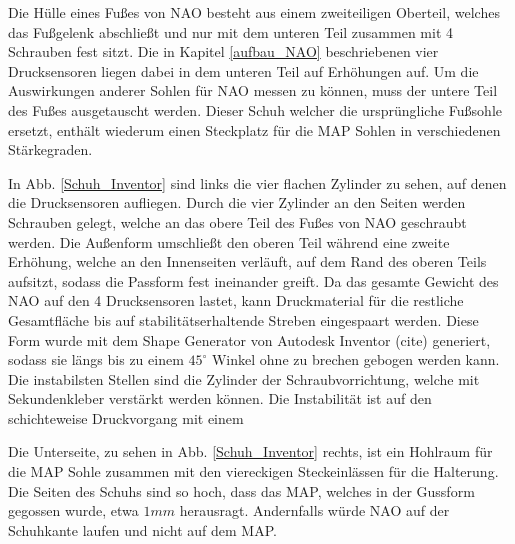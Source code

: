 Die Hülle eines Fußes von NAO besteht aus einem zweiteiligen Oberteil, welches das Fußgelenk abschließt und nur mit dem unteren Teil zusammen mit 4 Schrauben fest sitzt. Die in Kapitel \ref{aufbau_NAO} beschriebenen vier Drucksensoren liegen dabei in dem unteren Teil auf Erhöhungen auf. Um die Auswirkungen anderer Sohlen für NAO messen zu können, muss der untere Teil des Fußes ausgetauscht werden. Dieser 	\glqq Schuh\grqq{} welcher die ursprüngliche Fußsohle ersetzt, enthält wiederum einen Steckplatz für die MAP Sohlen in verschiedenen Stärkegraden. 

In Abb. \ref{Schuh_Inventor} sind links die vier flachen Zylinder zu sehen, auf denen die Drucksensoren aufliegen. Durch die vier Zylinder an den Seiten werden Schrauben gelegt, welche an das obere Teil des Fußes von NAO geschraubt werden. Die Außenform umschließt den oberen Teil während eine zweite Erhöhung, welche an den Innenseiten verläuft, auf dem Rand des oberen Teils aufsitzt, sodass die Passform fest ineinander greift. Da das gesamte Gewicht des NAO auf den 4 Drucksensoren lastet, kann Druckmaterial für die restliche Gesamtfläche bis auf stabilitätserhaltende Streben eingespaart werden. Diese Form wurde mit dem Shape Generator von Autodesk Inventor (cite) generiert, sodass sie längs bis zu einem $45^\circ$ Winkel ohne zu brechen gebogen werden kann. Die instabilsten Stellen sind die Zylinder der Schraubvorrichtung, welche mit Sekundenkleber verstärkt werden können. Die Instabilität ist auf den schichteweise Druckvorgang mit einem   

Die Unterseite, zu sehen in Abb. \ref{Schuh_Inventor} rechts, ist ein Hohlraum für die MAP Sohle zusammen mit den viereckigen Steckeinlässen für die Halterung. Die Seiten des Schuhs sind so hoch, dass das MAP, welches in der Gussform gegossen wurde, etwa $1 \unit{mm}$ herausragt. Andernfalls würde NAO auf der Schuhkante laufen und nicht auf dem MAP.  

